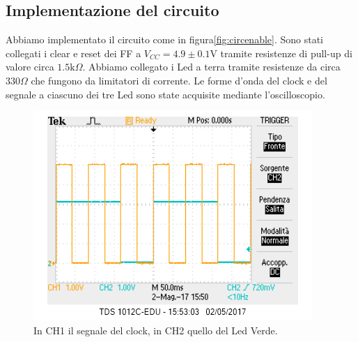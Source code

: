 \documentclass[10pt,a4paper]{article}
\begin{document}
\subsection{Implementazione del circuito}
Abbiamo implementato il circuito come in figura\ref{fig:circenable}.
Sono stati collegati i clear e reset dei FF a $V_{CC} = 4.9\pm0.1 $V tramite resistenze di pull-up di valore circa $1.5\mbox{k}\Omega$. Abbiamo collegato i Led a terra tramite resistenze da circa $330\Omega$ che fungono da limitatori di corrente.
Le forme d'onda del clock e del segnale a ciascuno dei tre Led sono state acquisite mediante l'oscilloscopio.

\begin{figure}[!htb]
\centering
\includegraphics[scale=0.7]{clock-verde.png}
\caption{In CH1 il segnale del clock, in CH2 quello del Led Verde.\label{fig:verde}}
\end{figure}
\end{document}
